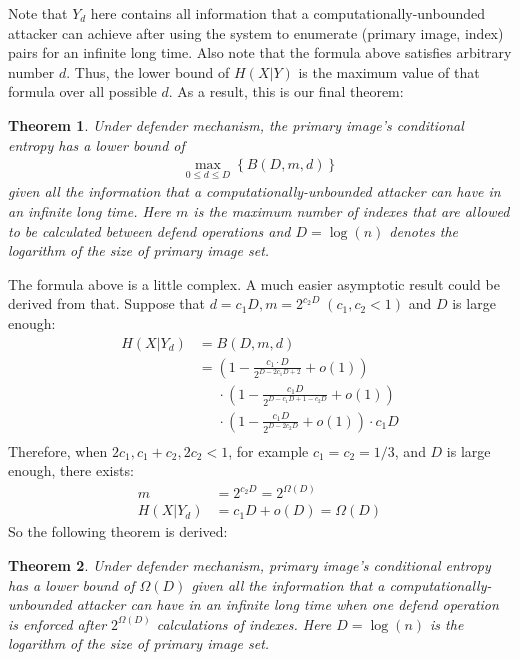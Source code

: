 \documentclass[10pt, conference, compsocconf]{IEEEtran}
\newtheorem{mytheorem}{Theorem}
\begin{document}
        Note that $Y_d$ here contains all
        information that a computationally-unbounded
        attacker can achieve after
        using the system to enumerate (primary image, index) pairs
        for an infinite long time. Also note that the formula above
        satisfies arbitrary number $d$. Thus, the lower bound
        of $H(X | Y)$ is the maximum value of that formula
        over all possible $d$.
        As a result, this is our final theorem:
        \begin{mytheorem}\label{thm1}
            Under defender mechanism,
            the primary image's conditional entropy has a lower bound of
            \begin{align*}
                \max_{0 \leq d \leq D} \left\{ B(D, m, d) \right\}
            \end{align*}
            given all the information
            that a computationally-unbounded attacker can
            have in an infinite long time. Here $m$ is
            the maximum number of indexes that are allowed to be calculated
            between defend operations and $D = \log(n)$ denotes the
            logarithm of the size of primary image set.
        \end{mytheorem}

        The formula above is a little complex. A much easier asymptotic result
        could be derived from that. Suppose that
        $d = c_1 D, m = 2^{c_2 D} \; (c_1, c_2 < 1)$ and $D$ is large enough:
        \begin{align*}
            H(X | Y_d) &= B(D, m, d)\\
                        &= \left(1-\frac{c_1 \cdot D}{ 2^{D-2 c_1 D+2} } + o(1) \right)\\
                            &\;\;\;\;\; \cdot \left(1-\frac{c_1 D}{2^{D-c_1 D+1 - c_2 D}} + o(1) \right)\\
                            &\;\;\;\;\; \cdot \left(1-\frac{c_1 D}{2^{D-2 c_2 D}} + o(1) \right) \cdot c_1 D\\
        \end{align*}
        Therefore, when $2c_1, c_1+c_2, 2c_2 < 1$, for example $c_1 = c_2 = 1/3$,
        and $D$ is large enough, there exists:
        \begin{align*}
            m &= 2^{c_2 D} = 2^{\Omega(D)}\\
            H(X | Y_d) &= c_1D+o(D) = \Omega(D)
        \end{align*}
        So the following theorem is derived:
        \begin{mytheorem}
            Under defender mechanism,
            primary image's conditional entropy has a lower bound of $\Omega(D)$
            given all the information
            that a computationally-unbounded attacker can
            have in an infinite long time when one defend operation
            is enforced after $2^{\Omega(D)}$ calculations of indexes.
            Here $D = \log(n)$ is the
            logarithm of the size of primary image set.
        \end{mytheorem}
\end{document}
